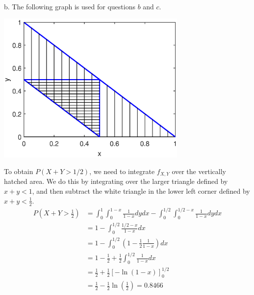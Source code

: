 \begin{exercise}
\begin{solution}
b.         The following graph is used for questions $b$ and $c$.
        \begin{center}
            \includegraphics[width = 0.7\textwidth]{figures/pie.eps}
        \end{center}
        To obtain $P(X+Y>1/2)$, we need to integrate $f_{X,Y}$ over the vertically hatched area. We do this by integrating over the larger triangle defined by $x+y<1$, and then subtract the white triangle in the lower left corner defined by $x+y<\frac{1}{2}$.
        \begin{align*}
            P\left(X+Y>\frac{1}{2}\right) &= \int_{0}^{1}\int_{0}^{1-x}\frac{1}{1-x}dydx - \int_{0}^{1/2}\int_{0}^{1/2-x}\frac{1}{1-x}dydx\\
            & = 1-\int_{0}^{1/2}\frac{1/2-x}{1-x}dx\\
            & = 1-\int_{0}^{1/2}\left(1-\frac{1}{2}\frac{1}{1-x}\right)dx\\
            & = 1-\frac{1}{2} + \frac{1}{2}\int_{0}^{1/2}\frac{1}{1-x}dx\\
            & = \frac{1}{2}+\frac{1}{2}\left[-\ln(1-x)\right]^{1/2}_{0}\\
            & = \frac{1}{2}-\frac{1}{2}\ln\left(\frac{1}{2}\right)=0.8466
        \end{align*}



\end{solution}
\end{exercise}
